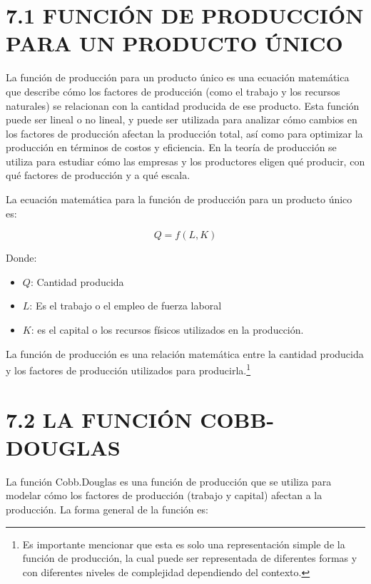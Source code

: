 \documentclass[
  spanish,
  12pt,
]{book}
\providecommand{\tightlist}{%
  \setlength{\itemsep}{0pt}\setlength{\parskip}{0pt}}
\begin{document}
\newpage

\section{7.1 FUNCIÓN DE PRODUCCIÓN PARA UN PRODUCTO
ÚNICO}\label{funciuxf3n-de-producciuxf3n-para-un-producto-uxfanico}

La función de producción para un producto único es una ecuación
matemática que describe cómo los factores de producción (como el trabajo
y los recursos naturales) se relacionan con la cantidad producida de ese
producto. Esta función puede ser lineal o no lineal, y puede ser
utilizada para analizar cómo cambios en los factores de producción
afectan la producción total, así como para optimizar la producción en
términos de costos y eficiencia. En la teoría de producción se utiliza
para estudiar cómo las empresas y los productores eligen qué producir,
con qué factores de producción y a qué escala.

La ecuación matemática para la función de producción para un producto
único es:

\begin{equation}
Q = f(L, K)
\end{equation}

Donde:

\begin{itemize}
\tightlist
\item
  \(Q\): Cantidad producida
\item
  \(L\): Es el trabajo o el empleo de fuerza laboral
\item
  \(K\): es el capital o los recursos físicos utilizados en la
  producción.
\end{itemize}

La función de producción es una relación matemática entre la cantidad
producida y los factores de producción utilizados para
producirla.\footnote{Es importante mencionar que esta es solo una
  representación simple de la función de producción, la cual puede ser
  representada de diferentes formas y con diferentes niveles de
  complejidad dependiendo del contexto.}

\section{7.2 LA FUNCIÓN COBB-DOUGLAS}\label{la-funciuxf3n-cobb-douglas}

La función Cobb.Douglas es una función de producción que se utiliza para
modelar cómo los factores de producción (trabajo y capital) afectan a la
producción. La forma general de la función es:
\end{document}
